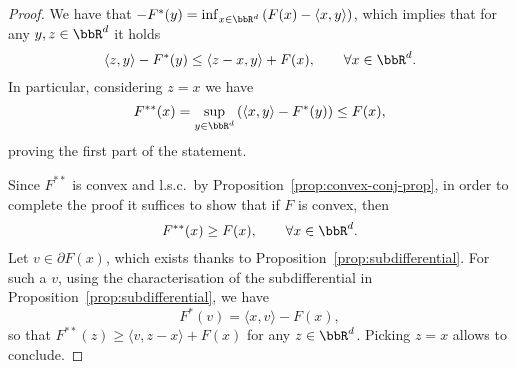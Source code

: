  \begin{proof}
     We have that $-F^*(y)=\inf_{x\in\bbR^d} \left(F(x)-\langle x,y\rangle\right)$, which implies that for any $y,z\in\bbR^d$ it holds
     \begin{equation}
         \langle z,y\rangle - F^*(y) \le \langle z-x,y\rangle +F(x), \qquad \forall x\in\bbR^d.
     \end{equation}
     In particular, considering $z=x$ we have
     \begin{equation}
         F^{**}(x) = \sup_{y\in\bbR^d} \left(\langle x,y\rangle - F^*(y)\right) \le F(x),
     \end{equation}
     proving the first part of the statement.
 
     Since $F^{**}$ is convex and l.s.c.~by Proposition~\ref{prop:convex-conj-prop}, in order to complete the proof it suffices to show that if $F$ is convex, then
     \begin{equation}
         F^{**}(x)\ge F(x),\qquad \forall x\in\bbR^d.
     \end{equation}
     Let $v\in \partial F(x)$, which exists thanks to Proposition~\ref{prop:subdifferential}. For such a $v$, using the characterisation of the subdifferential in Proposition~\ref{prop:subdifferential}, we have
     \begin{equation}
         F^*(v)=\langle x,v\rangle - F(x),
     \end{equation}
     so that $F^{**}(z)\ge \langle v,z-x\rangle+F(x)$ for any $z\in \bbR^d$. Picking $z=x$ allows to conclude.
 \end{proof}
 
 
 
 

